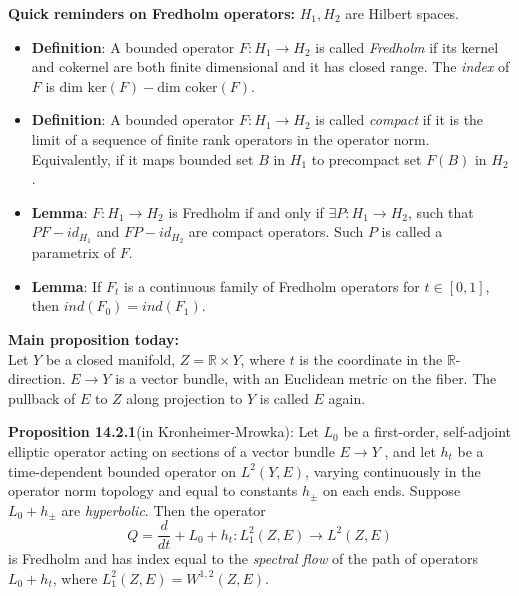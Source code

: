 		\textbf{Quick reminders on Fredholm operators:}
		\vspace{5mm}
		$H_1,H_2$ are Hilbert spaces.
		\begin{itemize}
			\item \textbf{Definition}: A bounded operator $F: H_1\rightarrow H_2$ is called \textit{Fredholm} if its kernel and cokernel are both finite dimensional and it has closed range. The \textit{index} of $F$ is $\text {dim ker}(F) - \text{dim coker}(F)$.
			\item \textbf{Definition}: A bounded operator $F: H_1\rightarrow H_2$ is called \textit{compact} if it is the limit of a sequence of finite rank operators in the operator norm. Equivalently, if it maps bounded set $B$ in $H_1$ to precompact set $F(B)$ in $H_2$.
			 \item 	\textbf{Lemma}: $F: H_1\rightarrow H_2$ is Fredholm if and only if $\exists P: H_1\rightarrow H_2$, such that $PF -id_{H_1}$ and $FP - id_{H_2}$ are compact operators. Such $P$ is called a parametrix of $F$.
			 \item \textbf{Lemma}: If $F_t$ is a continuous family of Fredholm operators for $t\in[0,1]$, then $ind(F_0) = ind(F_1)$.
			
		\end{itemize}
	\vspace{5mm}
		\textbf{Main proposition today:}\\
		\vspace{5mm}
		Let $Y$ be a closed manifold, $Z = \mathbb{R}\times Y$, where $t$ is the coordinate in the $\mathbb{R}$-direction. $E\rightarrow Y $ is a vector bundle, with an Euclidean metric on the fiber. The pullback of $E$ to $Z$ along projection to $Y$ is called $E$ again.
		\vspace*{5mm} 
		
		
		
			\textbf{Proposition 14.2.1}(in Kronheimer-Mrowka): Let $L_0$ be a first-order, self-adjoint elliptic operator acting
			on sections of a vector bundle $E \rightarrow Y$ , and let $h_t$ be a time-dependent bounded
			operator on $L^2(Y,E)$, varying continuously in the operator norm topology
			and equal to constants $h_{\pm}$ on each ends. Suppose $L_0 + h_{\pm}$ are \textit{hyperbolic}. Then the operator
		\[Q = \dfrac{d}{dt} + L_0 + h_{t} : L^2_1(Z,E) \rightarrow L^2(Z,E)\]
			is Fredholm and has index equal to the \textit{spectral flow} of the path of operators
			$L_0+h_t$, where $L^2_1(Z,E) = W^{1,2}(Z,E)$.
			\vspace{5mm}
		

